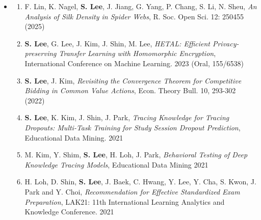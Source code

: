 \documentclass[letterpaper,11pt]{article}
\newcommand{\ressubsection}[1]{%
  \par\addvspace{4pt}{\sffamily\bfseries\color{muted}#1}\par\nobreak\vspace{2pt}}
\begin{document}
\begin{itemize}
\begin{enumerate}
		\item J. Baek, \textbf{S. Lee}, \emph{An equilateral triangle of side $>n$ cannot be covered by $n^2 + 1$ unit equilateral triangles homothetic to it}, Amer. Math. Monthly, 1-9 (2024)
		\item D. Choi, \textbf{S. Lee}, \emph{Non-archimedean Sendov's conjecture}, 
		$p$-Adic Numbers Ultrametric Anal. Appl. 14, 77-80 (2022)
		\item \textbf{S. Lee}, \emph{Maass wave forms, Quantum Modular Forms and Hecke Operators}, Res. Math. Sci. 6, 7 (2018), Modular Forms are Everywhere: Celebration of Don Zagier's 65th Birthday
		\item \textbf{S. Lee}, \emph{Quantum Modular Forms and Hecke Operators}, Res. Number Theory 4, 18 (2018)
		\item Y. Chen, R. Chernov, M. Flores, M. F. Bourque, \textbf{S. Lee}, B. Yang, \emph{Toy Teichm\"uller spaces of real dimension 2: the pentagon and the punctured triangle}, Geom. Dedicata 197 (2018), 193-227
	\end{enumerate}
	\item[] \ressubsection{Other Fields}
	\begin{enumerate}
		\item F. Lin, K. Nagel, \textbf{S. Lee}, J. Jiang, G. Yang, P. Chang, S. Li, N. Sheu, \emph{An Analysis of Silk Density in Spider Webs}, R. Soc. Open Sci. 12: 250455 (2025)
		\item \textbf{S. Lee}, G. Lee, J. Kim, J. Shin, M. Lee, \emph{HETAL: Efficient Privacy-preserving Transfer Learning with Homomorphic Encryption}, International Conference on Machine Learning. 2023 (Oral, 155/6538)
		\item \textbf{S. Lee}, J. Kim, \emph{Revisiting the Convergence Theorem for Competitive Bidding in Common Value Actions}, Econ. Theory Bull. 10, 293-302 (2022)
		\item \textbf{S. Lee}, K. Kim, J. Shin, J. Park, \emph{Tracing Knowledge for Tracing Dropouts: Multi-Task Training for Study Session Dropout Prediction}, Educational Data Mining. 2021
		\item M. Kim, Y. Shim, \textbf{S. Lee}, H. Loh, J. Park, \emph{Behavioral Testing of Deep Knowledge Tracing Models}, Educational Data Mining 2021
		\item H. Loh, D. Shin, \textbf{S. Lee}, J. Baek, C. Hwang, Y. Lee, Y. Cha, S. Kwon, J. Park and Y. Choi, \emph{Recommendation for Effective Standardized Exam Preparation}, LAK21: 11th International Learning Analytics and Knowledge Conference. 2021

\end{enumerate}
\end{itemize}
\end{document}

